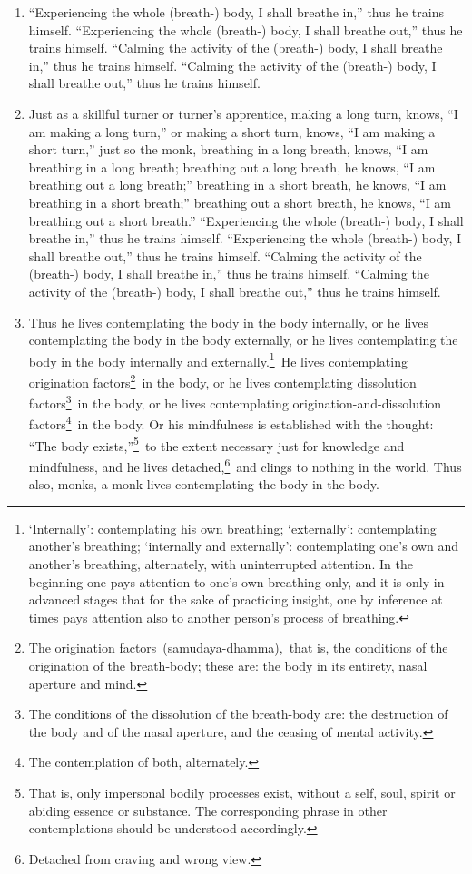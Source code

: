 \begin{enumerate}[resume]
\item “Experiencing the whole (breath-) body, I shall breathe in,” thus he trains himself. “Experiencing the whole (breath-) body, I shall breathe out,” thus he trains himself. “Calming the activity of the (breath-) body, I shall breathe in,” thus he trains himself. “Calming the activity of the (breath-) body, I shall breathe out,” thus he trains himself.
\item Just as a skillful turner or turner's apprentice, making a long turn, knows, ``I am making a long turn,” or making a short turn, knows, ``I am making a short turn,” just so the monk, breathing in a long breath, knows, ``I am breathing in a long breath; breathing out a long breath, he knows, ``I am breathing out a long breath;” breathing in
a short breath, he knows, “I am breathing in a short breath;” breathing out a short breath, he knows, “I am breathing out a short breath.” “Experiencing the whole (breath-) body, I shall breathe in,” thus he trains himself. “Experiencing the whole (breath-) body, I shall breathe out,” thus he trains himself. “Calming the activity of the (breath-) body, I shall breathe in,” thus he trains himself. “Calming the activity of the (breath-) body, I shall breathe out,” thus he trains himself.
\item Thus he lives contemplating the body in the body internally, or he lives contemplating the body in the body externally, or he lives contemplating the body in the body internally and externally.\footnote{‘Internally’: contemplating his own breathing; ‘externally’: contemplating another’s breathing; ‘internally and externally’: contemplating one’s own and another’s breathing, alternately, with uninterrupted attention. In the beginning one pays attention to one’s own breathing only, and it is only in advanced stages that for the sake of practicing insight, one by inference at times pays attention also to another person’s process of breathing.} He lives contemplating origination factors\footnote{The origination factors (samudaya-dhamma), that is, the conditions of the origination of the breath-body; these are: the body in its entirety, nasal aperture and mind.} in the body, or he lives contemplating dissolution factors\footnote{The conditions of the dissolution of the breath-body are: the destruction of the body and of the nasal aperture, and the ceasing of mental activity.} in the body, or he lives contemplating origination-and-dissolution factors\footnote{The contemplation of both, alternately.} in the body. Or his mindfulness is established with the thought: “The body exists,”\footnote{That is, only impersonal bodily processes exist, without a self, soul, spirit or abiding essence or substance. The corresponding phrase in other contemplations should be understood accordingly.} to the extent necessary just for knowledge and mindfulness, and he lives detached,\footnote{Detached from craving and wrong view.} and clings to nothing in the world. Thus also, monks, a monk lives contemplating the body in the body.
\end{enumerate}
